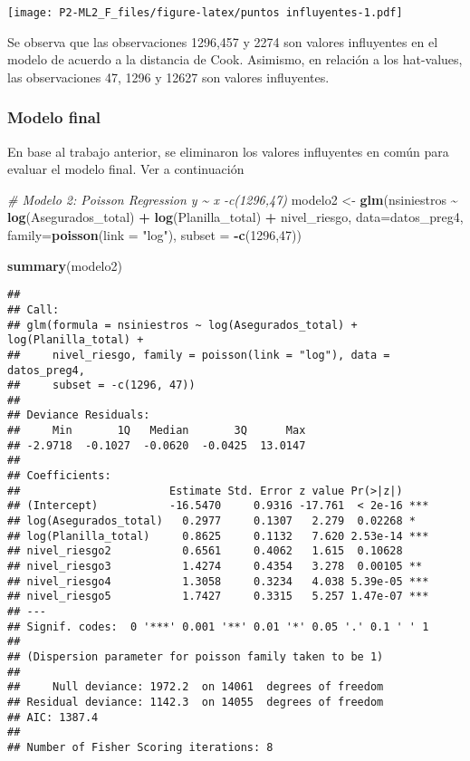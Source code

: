 \documentclass[]{article}
\newenvironment{Shaded}{\begin{snugshade}}{\end{snugshade}}
\newcommand{\CommentTok}[1]{\textcolor[rgb]{0.56,0.35,0.01}{\textit{#1}}}
\newcommand{\DataTypeTok}[1]{\textcolor[rgb]{0.13,0.29,0.53}{#1}}
\newcommand{\DecValTok}[1]{\textcolor[rgb]{0.00,0.00,0.81}{#1}}
\newcommand{\KeywordTok}[1]{\textcolor[rgb]{0.13,0.29,0.53}{\textbf{#1}}}
\newcommand{\NormalTok}[1]{#1}
\newcommand{\OperatorTok}[1]{\textcolor[rgb]{0.81,0.36,0.00}{\textbf{#1}}}
\newcommand{\StringTok}[1]{\textcolor[rgb]{0.31,0.60,0.02}{#1}}
\begin{document}
\texttt{[image: P2-ML2\_F\_files/figure-latex/puntos influyentes-1.pdf]}

Se observa que las observaciones 1296,457 y 2274 son valores influyentes
en el modelo de acuerdo a la distancia de Cook. Asimismo, en relación a
los hat-values, las observaciones 47, 1296 y 12627 son valores
influyentes.

\hypertarget{modelo-final}{%
\subsubsection{Modelo final}\label{modelo-final}}

En base al trabajo anterior, se eliminaron los valores influyentes en
común para evaluar el modelo final. Ver a continuación

\begin{Shaded}
\begin{Highlighting}[]
\CommentTok{\# Modelo 2: Poisson Regression y \textasciitilde{} x {-}c(1296,47)}
\NormalTok{modelo2 <{-}}\StringTok{ }\KeywordTok{glm}\NormalTok{(nsiniestros }\OperatorTok{\textasciitilde{}}\StringTok{ }\KeywordTok{log}\NormalTok{(Asegurados\_total) }\OperatorTok{+}\StringTok{ }\KeywordTok{log}\NormalTok{(Planilla\_total) }\OperatorTok{+}\StringTok{ }\NormalTok{nivel\_riesgo, }\DataTypeTok{data=}\NormalTok{datos\_preg4, }\DataTypeTok{family=}\KeywordTok{poisson}\NormalTok{(}\DataTypeTok{link =} \StringTok{"log"}\NormalTok{), }\DataTypeTok{subset =} \OperatorTok{{-}}\KeywordTok{c}\NormalTok{(}\DecValTok{1296}\NormalTok{,}\DecValTok{47}\NormalTok{))}

\KeywordTok{summary}\NormalTok{(modelo2)}
\end{Highlighting}
\end{Shaded}

\begin{verbatim}
## 
## Call:
## glm(formula = nsiniestros ~ log(Asegurados_total) + log(Planilla_total) + 
##     nivel_riesgo, family = poisson(link = "log"), data = datos_preg4, 
##     subset = -c(1296, 47))
## 
## Deviance Residuals: 
##     Min       1Q   Median       3Q      Max  
## -2.9718  -0.1027  -0.0620  -0.0425  13.0147  
## 
## Coefficients:
##                       Estimate Std. Error z value Pr(>|z|)    
## (Intercept)           -16.5470     0.9316 -17.761  < 2e-16 ***
## log(Asegurados_total)   0.2977     0.1307   2.279  0.02268 *  
## log(Planilla_total)     0.8625     0.1132   7.620 2.53e-14 ***
## nivel_riesgo2           0.6561     0.4062   1.615  0.10628    
## nivel_riesgo3           1.4274     0.4354   3.278  0.00105 ** 
## nivel_riesgo4           1.3058     0.3234   4.038 5.39e-05 ***
## nivel_riesgo5           1.7427     0.3315   5.257 1.47e-07 ***
## ---
## Signif. codes:  0 '***' 0.001 '**' 0.01 '*' 0.05 '.' 0.1 ' ' 1
## 
## (Dispersion parameter for poisson family taken to be 1)
## 
##     Null deviance: 1972.2  on 14061  degrees of freedom
## Residual deviance: 1142.3  on 14055  degrees of freedom
## AIC: 1387.4
## 
## Number of Fisher Scoring iterations: 8
\end{verbatim}
\end{document}

